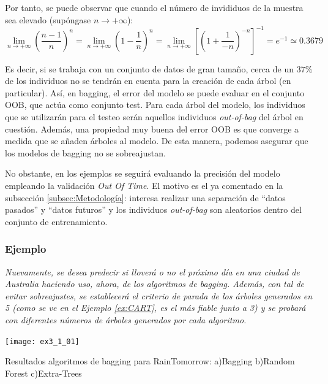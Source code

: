 \documentclass[12pt,twoside]{article}
\begin{document}
Por tanto, se puede observar que cuando el número de invididuos de la muestra sea elevado (supóngase $n \rightarrow +\infty$):
\begin{equation*}
\lim_{n \rightarrow + \infty} \left( \frac{n-1}{n} \right)^n = \lim_{n \rightarrow +\infty} \left( 1 - \frac{1}{n} \right)^n = \lim_{n \rightarrow +\infty} \left[ \left( 1 + \frac{1}{-n} \right)^{-n} \right] ^{-1} = e^{-1} \simeq 0.3679
\end{equation*}

Es decir, si se trabaja con un conjunto de datos de gran tamaño, cerca de un $37 \%$ de los individuos no se tendrán en cuenta para la creación de cada árbol (en particular). Así, en bagging, el error del modelo se puede evaluar en el conjunto OOB, que actúa como conjunto test. Para cada árbol del modelo, los individuos que se utilizarán para el testeo serán aquellos individuos \textit{out-of-bag} del árbol en cuestión. Además, una propiedad muy buena del error OOB es que converge a medida que se añaden árboles al modelo. De esta manera, podemos asegurar que los modelos de bagging no se sobreajustan.

No obstante, en los ejemplos se seguirá evaluando la precisión del modelo empleando la validación \textit{Out Of Time}. El motivo es el ya comentado en la subsección \ref{subsec:Metodología}: interesa realizar una separación de ``datos pasados'' y ``datos futuros'' y los individuos \textit{out-of-bag} son aleatorios dentro del conjunto de entrenamiento.




\subsubsection{Ejemplo} \label{ex:Bag}
\emph{Nuevamente, se desea predecir si lloverá o no el próximo día en una ciudad de Australia haciendo uso, ahora, de los algoritmos de bagging. Además, con tal de evitar sobreajustes, se establecerá el criterio de parada de los árboles generados en 5 (como se ve en el Ejemplo \ref{ex:CART}, es el más fiable junto a 3) y se probará con diferentes números de árboles generados por cada algoritmo.}

\begin{table}[h]
\centering
\texttt{[image: ex3\_1\_01]}
\caption{Resultados algoritmos de bagging para RainTomorrow: a)Bagging b)Random Forest c)Extra-Trees}
\label{tab:exbagging}
\end{table}
\end{document}
